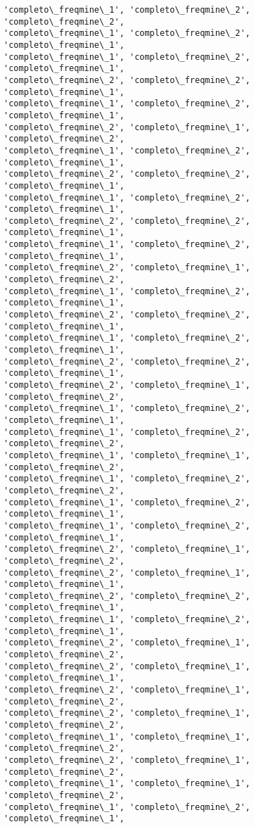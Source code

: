\documentclass[11pt]{article}
\begin{document}
\begin{Verbatim}[commandchars=\\\{\}]
'completo\_freqmine\_1', 'completo\_freqmine\_2', 'completo\_freqmine\_2',
'completo\_freqmine\_1', 'completo\_freqmine\_2', 'completo\_freqmine\_1',
'completo\_freqmine\_1', 'completo\_freqmine\_2', 'completo\_freqmine\_1',
'completo\_freqmine\_2', 'completo\_freqmine\_2', 'completo\_freqmine\_1',
'completo\_freqmine\_1', 'completo\_freqmine\_2', 'completo\_freqmine\_1',
'completo\_freqmine\_2', 'completo\_freqmine\_1', 'completo\_freqmine\_2',
'completo\_freqmine\_1', 'completo\_freqmine\_2', 'completo\_freqmine\_1',
'completo\_freqmine\_2', 'completo\_freqmine\_2', 'completo\_freqmine\_1',
'completo\_freqmine\_1', 'completo\_freqmine\_2', 'completo\_freqmine\_1',
'completo\_freqmine\_2', 'completo\_freqmine\_2', 'completo\_freqmine\_1',
'completo\_freqmine\_1', 'completo\_freqmine\_2', 'completo\_freqmine\_1',
'completo\_freqmine\_2', 'completo\_freqmine\_1', 'completo\_freqmine\_2',
'completo\_freqmine\_1', 'completo\_freqmine\_2', 'completo\_freqmine\_1',
'completo\_freqmine\_2', 'completo\_freqmine\_2', 'completo\_freqmine\_1',
'completo\_freqmine\_1', 'completo\_freqmine\_2', 'completo\_freqmine\_1',
'completo\_freqmine\_2', 'completo\_freqmine\_2', 'completo\_freqmine\_1',
'completo\_freqmine\_2', 'completo\_freqmine\_1', 'completo\_freqmine\_2',
'completo\_freqmine\_1', 'completo\_freqmine\_2', 'completo\_freqmine\_1',
'completo\_freqmine\_1', 'completo\_freqmine\_2', 'completo\_freqmine\_2',
'completo\_freqmine\_1', 'completo\_freqmine\_1', 'completo\_freqmine\_2',
'completo\_freqmine\_1', 'completo\_freqmine\_2', 'completo\_freqmine\_2',
'completo\_freqmine\_1', 'completo\_freqmine\_2', 'completo\_freqmine\_1',
'completo\_freqmine\_1', 'completo\_freqmine\_2', 'completo\_freqmine\_1',
'completo\_freqmine\_2', 'completo\_freqmine\_1', 'completo\_freqmine\_2',
'completo\_freqmine\_2', 'completo\_freqmine\_1', 'completo\_freqmine\_1',
'completo\_freqmine\_2', 'completo\_freqmine\_2', 'completo\_freqmine\_1',
'completo\_freqmine\_1', 'completo\_freqmine\_2', 'completo\_freqmine\_1',
'completo\_freqmine\_2', 'completo\_freqmine\_1', 'completo\_freqmine\_2',
'completo\_freqmine\_2', 'completo\_freqmine\_1', 'completo\_freqmine\_1',
'completo\_freqmine\_2', 'completo\_freqmine\_1', 'completo\_freqmine\_2',
'completo\_freqmine\_2', 'completo\_freqmine\_1', 'completo\_freqmine\_2',
'completo\_freqmine\_1', 'completo\_freqmine\_1', 'completo\_freqmine\_2',
'completo\_freqmine\_2', 'completo\_freqmine\_1', 'completo\_freqmine\_2',
'completo\_freqmine\_1', 'completo\_freqmine\_1', 'completo\_freqmine\_2',
'completo\_freqmine\_1', 'completo\_freqmine\_2', 'completo\_freqmine\_1',

\end{Verbatim}
\end{document}
